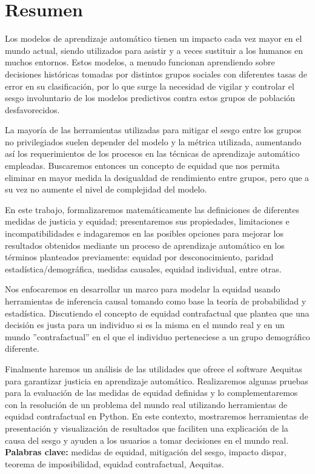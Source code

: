 \chapter*{Resumen}


Los modelos de aprendizaje automático tienen un impacto cada vez mayor en el mundo actual, siendo utilizados para asistir y a veces sustituir a los humanos en muchos entornos. Estos modelos, a menudo funcionan aprendiendo sobre decisiones históricas tomadas por distintos grupos sociales con diferentes tasas de error en su clasificación, por lo que surge la necesidad de vigilar y controlar el sesgo involuntario de los modelos predictivos contra estos
grupos de población desfavorecidos.

La mayoría de las herramientas utilizadas para mitigar el sesgo entre los grupos no privilegiados suelen depender del modelo y la métrica utilizada, aumentando así los requerimientos de los procesos en las técnicas de aprendizaje automático empleadas. Buscaremos entonces un concepto de equidad que nos permita eliminar en mayor medida la desigualdad de rendimiento entre grupos, pero que a su vez no aumente el nivel de complejidad del modelo.

En este trabajo, formalizaremos matemáticamente las definiciones de diferentes medidas de justicia y
equidad; presentaremos sus propiedades, limitaciones e incompatibilidades e indagaremos en las posibles opciones
para mejorar los resultados obtenidos mediante un proceso de aprendizaje automático en los
términos planteados previamente:
equidad por desconocimiento, paridad estadística/demográfica, medidas causales, equidad individual, entre otras.

Nos enfocaremos en desarrollar un marco para modelar la equidad usando herramientas de inferencia causal tomando como base la teoría de probabilidad y estadística. Discutiendo el concepto de equidad contrafactual que plantea que una decisión es justa para un individuo si es la misma en el mundo real y en un
mundo ''contrafactual'' en el que el individuo perteneciese a un grupo demográfico
diferente. 

Finalmente haremos un análisis de las utilidades que ofrece el software Aequitas para garantizar justicia en aprendizaje automático. Realizaremos algunas pruebas para la evaluación de las medidas de equidad definidas y lo complementaremos con la resolución de un problema del mundo real utilizando herramientas de equidad contrafactual en Python. En este contexto, mostraremos herramientas de presentación y visualización de resultados que faciliten una explicación de la causa del sesgo y ayuden a los usuarios a tomar decisiones en el mundo real.\\

\textbf{Palabras clave:} medidas de equidad, mitigación del sesgo, impacto dispar, teorema de imposibilidad, equidad contrafactual, Aequitas.